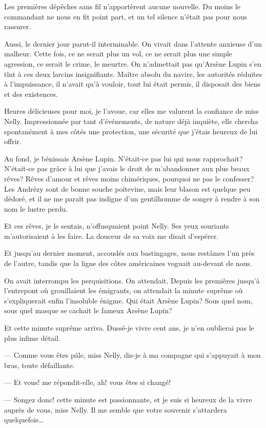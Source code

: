 \documentclass[12pt,a4paper]{book}
\begin{document}
Les premières dépêches sans fil n’apportèrent aucune nouvelle. Du moins le commandant ne nous en fit point part, et un tel silence n’était pas pour nous rassurer.

Aussi, le dernier jour parut-il interminable. On vivait dans l’attente anxieuse d’un malheur. Cette fois, ce ne serait plus un vol, ce ne serait plus une simple agression, ce serait le crime, le meurtre. On n’admettait pas qu’Arsène Lupin s’en tînt à ces deux larcins insignifiants. Maître absolu du navire, les autorités réduites à l’impuissance, il n’avait qu’à vouloir, tout lui était permis, il disposait des biens et des existences.

Heures délicieuses pour moi, je l’avoue, car elles me valurent la confiance de miss Nelly. Impressionnée par tant d’événements, de nature déjà inquiète, elle chercha spontanément à mes côtés une protection, une sécurité que j’étais heureux de lui offrir.

Au fond, je bénissais Arsène Lupin. N’était-ce pas lui qui nous rapprochait? N’était-ce pas grâce à lui que j’avais le droit de m’abandonner aux plus beaux rêves? Rêves d’amour et rêves moins chimériques, pourquoi ne pas le confesser? Les Andrézy sont de bonne souche poitevine, mais leur blason est quelque peu dédoré, et il ne me paraît pas indigne d’un gentilhomme de songer à rendre à son nom le lustre perdu.

Et ces rêves, je le sentais, n’offusquaient point Nelly. Ses yeux souriants m’autorisaient à les faire. La douceur de sa voix me disait d’espérer.

Et jusqu’au dernier moment, accoudés aux bastingages, nous restâmes l’un près de l’autre, tandis que la ligne des côtes américaines voguait au-devant de nous.

On avait interrompu les perquisitions. On attendait. Depuis les premières jusqu’à l’entrepont où grouillaient les émigrants, on attendait la minute suprême où s’expliquerait enfin l’insoluble énigme. Qui était Arsène Lupin? Sous quel nom, sous quel masque se cachait le fameux Arsène Lupin?

Et cette minute suprême arriva. Dussé-je vivre cent ans, je n’en oublierai pas le plus infime détail.

— Comme vous êtes pâle, miss Nelly, dis-je à ma compagne qui s’appuyait à mon bras, toute défaillante.

— Et vous! me répondit-elle, ah! vous êtes si changé!

— Songez donc! cette minute est passionnante, et je suis si heureux de la vivre auprès de vous, miss Nelly. Il me semble que votre souvenir s’attardera quelquefois…
\end{document}
